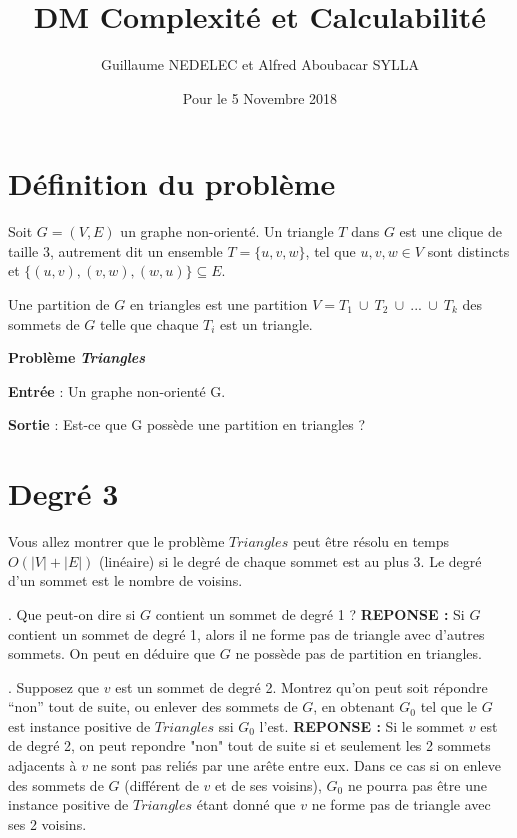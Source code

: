 \documentclass{article}
\title{DM Complexité et Calculabilité}
\author{Guillaume NEDELEC et Alfred Aboubacar SYLLA }
\date{Pour le 5 Novembre 2018}
\begin{document}
    
    \maketitle
    
    \section{Définition du problème}
    
    Soit \textit{$G = (V, E)$} un graphe non-orienté. Un triangle \textit{$T$} dans \textit{$G$} est une clique de taille 3,  autrement dit un ensemble \textit{$T = \{ u, v, w \}$}, tel que \textit{$u, v, w \in V$} sont distincts et \textit{$\{(u, v),(v, w),(w, u)\} \subseteq E$}.
    
    Une partition de \textit{$G$} en triangles est une partition \textit{$V = T_{1} \: \cup \: T_{2} \: \cup \: . . . \: \cup \: T_{k}$} des sommets de \textit{$G$} telle que chaque \textit{$T_{i}$} est un triangle.
    
    \smallbreak
    
    \textbf{Problème} \textbf{\textit{Triangles}}
    
    \textbf{Entrée} : Un graphe non-orienté G.
    
    \textbf{Sortie} : Est-ce que G possède une partition en triangles ?
    
    \section{Degré 3 }
    
    Vous allez montrer que le problème $Triangles$ peut être résolu en temps $O(|V| + |E|)$ (linéaire) si le degré de chaque sommet est au plus 3. Le degré d’un sommet est le nombre de voisins.
    \bigbreak
    
    . Que peut-on dire si $G$ contient un sommet de degré 1 ?
    \smallbreak
    \noindent \textbf{REPONSE :} Si $G$ contient un sommet de degré 1, alors il ne forme pas de triangle avec d'autres sommets. On peut en déduire que $G$ ne possède pas de partition en triangles.
    \bigbreak
    
    . Supposez que $v$ est un sommet de degré 2. Montrez qu’on peut soit répondre “non” tout de suite, ou enlever des sommets de $G$, en obtenant $G_{0}$ tel que le $G$ est instance positive de $Triangles$ ssi $G_{0}$ l’est.
    \smallbreak
    \noindent \textbf{REPONSE :} Si le sommet $v$ est de degré 2, on peut repondre "non" tout de suite si et seulement les 2 sommets adjacents à $v$ ne sont pas reliés par une arête entre eux. Dans ce cas si on enleve des sommets de $G$ (différent de $v$ et de ses voisins), $G_{0}$ ne pourra pas être une instance positive de $Triangles$ étant donné que $v$ ne forme pas de triangle avec ses 2 voisins.
    \bigbreak
    
\end{document}
